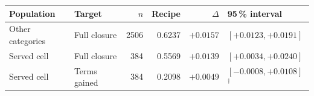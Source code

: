 \begin{tabular}{llrrrl}
\toprule
    \textbf{Population} & \textbf{Target} & \textbf{$n$} & \textbf{Recipe} & \textbf{$\Delta$} & \textbf{95\,\% interval} \\
\midrule
    Other categories & Full closure & 2506 & 0.6237 & $+0.0157$ & $[+0.0123, +0.0191]$ \\
    Served cell & Full closure & 384 & 0.5569 & $+0.0139$ & $[+0.0034, +0.0240]$ \\
    Served cell & Terms gained & 384 & 0.2098 & $+0.0049$ & $[-0.0008, +0.0108]$$^{\dagger}$ \\
\bottomrule
\end{tabular}
